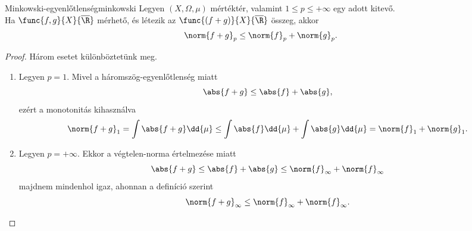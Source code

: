 \documentclass[
]{elteikthesis}[2024/04/26]
\begin{document}
	\newpage
	
	\begin{theorem}{Minkowski-egyenlőtlenség}{minkowski}
		Legyen \( (X, \Omega, \mu) \) mértéktér, 
		valamint \( 1 \leq p \leq +\infty \) egy adott kitevő.\\[6pt]
		Ha \( \func{f, g}{X}{\overline{\R}} \) mérhető, 
		és létezik az \( \func{(f + g)}{X}{\overline{\R}} \) összeg, akkor
		\[
			\norm{f + g}_p \leq \norm{f}_p + \norm{g}_p.
		\]
	\end{theorem}
	\begin{proof}
		Három esetet különböztetünk meg.
		\begin{enumerate}
			\item Legyen \( p = 1 \). Mivel a háromszög-egyenlőtlenség miatt
			\[
				\abs{f + g} \leq
				\abs{f} + \abs{g},
			\]
			ezért a monotonitás kihasználva
			\[
				\norm{f + g}_1 =
				\int \abs{f + g} \dd{\mu} \leq
				\int \abs{f} \dd{\mu} + \int \abs{g} \dd{\mu} =
				\norm{f}_1 + \norm{g}_1.
			\]
			
			\item Legyen \( p = +\infty \). Ekkor a végtelen-norma értelmezése miatt
			\[
				\abs{f + g} \leq
				\abs{f} + \abs{g} \leq
				\norm{f}_\infty + \norm{f}_\infty
			\]
			majdnem mindenhol igaz, ahonnan a definíció szerint
			\[
				\norm{f + g}_\infty \leq
				\norm{f}_\infty + \norm{f}_\infty.
			\]
			

\end{enumerate}
\end{proof}
\end{document}
